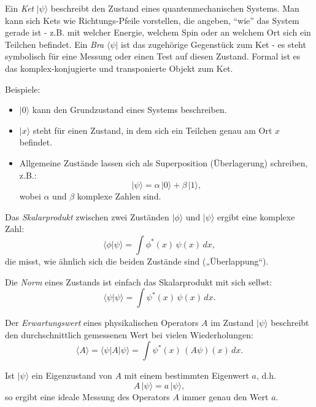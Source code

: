 Ein \emph{Ket} $|\psi\rangle$ beschreibt den Zustand eines quantenmechanischen Systems.
Man kann sich Kets wie Richtungs-Pfeile vorstellen, die angeben, ``wie'' das System gerade ist - z.B. mit welcher Energie, welchem Spin oder an welchem Ort sich ein Teilchen befindet.
Ein \emph{Bra} $\langle\psi|$ ist das zugehörige Gegenstück zum Ket - es steht symbolisch für eine Messung oder einen Test auf diesen Zustand.
Formal ist es das komplex-konjugierte und transponierte Objekt zum Ket.

Beispiele:
\begin{itemize}
  \item $|0\rangle$ kann den Grundzustand eines Systems beschreiben.
  \item $|x\rangle$ steht für einen Zustand, in dem sich ein Teilchen genau am Ort $x$ befindet.
  \item Allgemeine Zustände lassen sich als Superposition (Überlagerung) schreiben, z.B.:
  \[
    |\psi\rangle = \alpha\,|0\rangle + \beta\,|1\rangle,
  \]
  wobei $\alpha$ und $\beta$ komplexe Zahlen sind.
\end{itemize}

Das \emph{Skalarprodukt} zwischen zwei Zuständen $|\phi\rangle$ und $|\psi\rangle$ ergibt eine komplexe Zahl:
\begin{equation}
  \langle \phi | \psi \rangle = \int \phi^*(x)\,\psi(x)\,dx,
\end{equation}
die misst, wie ähnlich sich die beiden Zustände sind („Überlappung“).

Die \emph{Norm} eines Zustands ist einfach das Skalarprodukt mit sich selbst:
\begin{equation}
  \langle \psi | \psi \rangle = \int \psi^*(x)\,\psi(x)\,dx.
\end{equation}

Der \emph{Erwartungswert} eines physikalischen Operators $A$ im Zustand $|\psi\rangle$ beschreibt den durchschnittlich gemessenen Wert bei vielen Wiederholungen:
\begin{equation}
  \langle A \rangle = \langle \psi | A | \psi \rangle = \int \psi^*(x)\,(A\psi)(x)\,dx.
\end{equation}

Ist $|\psi\rangle$ ein Eigenzustand von $A$ mit einem bestimmten Eigenwert $a$, d.h.
\begin{equation}
  A\,|\psi\rangle = a\,|\psi\rangle,
\end{equation}
so ergibt eine ideale Messung des Operators $A$ immer genau den Wert $a$.

